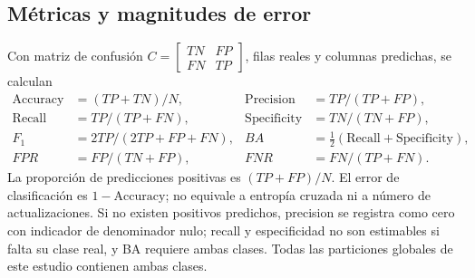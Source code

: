 \subsection{Métricas y magnitudes de error}
Con matriz de confusión $C=\left[\begin{smallmatrix}TN&FP\\FN&TP\end{smallmatrix}\right]$, filas reales y columnas predichas, se calculan
\begin{align}
\mathrm{Accuracy}&=(TP+TN)/N,&\mathrm{Precision}&=TP/(TP+FP),\\
\mathrm{Recall}&=TP/(TP+FN),&\mathrm{Specificity}&=TN/(TN+FP),\\
F_1&=2TP/(2TP+FP+FN),&BA&=\tfrac12(\mathrm{Recall}+\mathrm{Specificity}),\\
FPR&=FP/(TN+FP),&FNR&=FN/(TP+FN).
\end{align}
La proporción de predicciones positivas es $(TP+FP)/N$. El error de clasificación es $1-\mathrm{Accuracy}$; no equivale a entropía cruzada ni a número de actualizaciones. Si no existen positivos predichos, precision se registra como cero con indicador de denominador nulo; recall y especificidad no son estimables si falta su clase real, y BA requiere ambas clases. Todas las particiones globales de este estudio contienen ambas clases.
